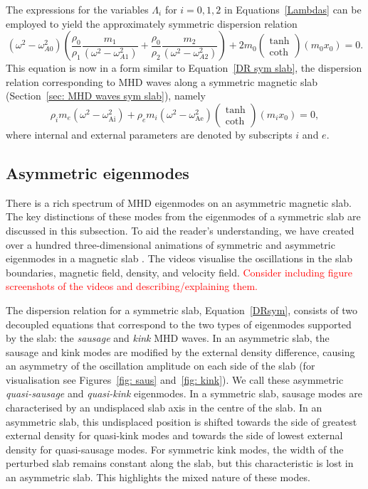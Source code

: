 \documentclass[12pt,draft]{../style-files/ociamthesis}
\begin{document}
The expressions for the variables $\Lambda_i$ for $i=0,1,2$ in Equations~\eqref{Lambdas} can be employed to yield the approximately symmetric dispersion relation
\begin{equation}
(\omega^2 - \omega_{A0}^2)\left(\frac{\rho_0}{\rho_1}\frac{m_1}{(\omega^2 - \omega_{A1}^2)} + \frac{\rho_0}{\rho_2}\frac{m_2}{(\omega^2 - \omega_{A2}^2)}\right) + 2m_0\left(\begin{matrix}\tanh \\ \coth \end{matrix}\right)(m_0x_0) = 0. \label{DR approx}
\end{equation}
This equation is now in a form similar to Equation~\eqref{DR sym slab}, the dispersion relation corresponding to MHD waves along a symmetric magnetic slab (Section~\ref{sec: MHD waves sym slab}), namely
\begin{equation}
\rho_im_e(\omega^2 - \omega_\textrm{Ai}^2) + \rho_em_i(\omega^2 - \omega_\textrm{Ae}^2)\left(\begin{matrix}\tanh \\ \coth \end{matrix}\right)(m_ix_0) = 0, \label{DRsym}
\end{equation}
where internal and external parameters are denoted by subscripts $i$ and $e$.


\subsection{Asymmetric eigenmodes}
There is a rich spectrum of MHD eigenmodes on an asymmetric magnetic slab. The key distinctions of these modes from the eigenmodes of a symmetric slab are discussed in this subsection. To aid the reader's understanding, we have created over a hundred three-dimensional animations of symmetric and asymmetric eigenmodes in a magnetic slab \cite{all_etal18c}. The videos visualise the oscillations in the slab boundaries, magnetic field, density, and velocity field. \textcolor{red}{Consider including figure screenshots of the videos and describing/explaining them.}

The dispersion relation for a symmetric slab, Equation~\eqref{DRsym}, consists of two decoupled equations that correspond to the two types of eigenmodes supported by the slab: the \textit{sausage} and \textit{kink} MHD waves. In an asymmetric slab, the sausage and kink modes are modified by the external density difference, causing an asymmetry of the oscillation amplitude on each side of the slab (for visualisation see Figures~\ref{fig: saus} and~\ref{fig: kink}). We call these asymmetric \textit{quasi-sausage} and \textit{quasi-kink} eigenmodes. In a symmetric slab, sausage modes are characterised by an undisplaced slab axis in the centre of the slab. In an asymmetric slab, this undisplaced position is shifted towards the side of greatest external density for quasi-kink modes and towards the side of lowest external density for quasi-sausage modes. For symmetric kink modes, the width of the perturbed slab remains constant along the slab, but this characteristic is lost in an asymmetric slab. This highlights the mixed nature of these modes.
\end{document}
